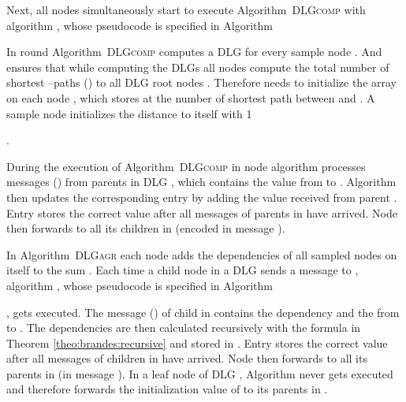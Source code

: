 \documentclass[11pt]{article}
\newcommand{\todoI}[1]{}\newcommand{\blueI}[1]{}
\newif\iffull
\newif\ifshort
\begin{document}
Next, all nodes simultaneously start to execute Algorithm\iffull~\ref{alg:DLGcomp}\fi~\textsc{DLGcomp} with algorithm , whose pseudocode is specified in Algorithm
\ifshort
 \ref{FULL:alg:BC_f} in Appendix \ref{sec:algBC}.
\fi
\iffull
 \ref{alg:BC_f}.
\fi
In round  Algorithm\iffull~\ref{alg:DLGcomp}\fi~\textsc{DLGcomp} computes a DLG  for every sample node . And  ensures that while computing the DLGs all nodes  compute the total number of shortest --paths () to all DLG root nodes . Therefore  needs to initialize the array  on each node , which stores at  the number of shortest path between  and \iffull (Lines \ref{line:fbcinitstart} to \ref{line:fbcinitend})\fi. A sample node  initializes the distance to itself with 1 

.
\iffull
\begin{algorithm}[htb]
\begin{algorithmic}[1]
\STATE \COMMENT{INITIALIZATION} \label{line:fbcinitstart}
\STATE \textbf{global} ; \COMMENT{ := total shortest paths from  to }
\IF{}
        \STATE ;\label{line:fbcinitend}\newline
\ENDIF

\STATE \COMMENT{COMPUTATION, :  root node ID of the message,  message of a parent in }
\STATE ;
\STATE ; \COMMENT{output}
\end{algorithmic}
\caption{}
\label{alg:BC_f}
\vspace*{0.5cm}
\end{algorithm}
\fi 
During the execution of Algorithm\iffull~\ref{alg:DLGcomp}\fi~\textsc{DLGcomp} in node  algorithm  processes messages () from parents  in DLG , which contains the value  from   to .
Algorithm  then updates the corresponding entry  by adding the value  received from parent . Entry  stores the correct value after all messages of parents in  have arrived. Node  then forwards  \iffull during the execution of Algorithm~\ref{alg:DLGcomp}~\textsc{DLGcomp} in Line \ref{line:sendreceivedist}\fi to all its children in  (encoded in message ).

In Algorithm\iffull~\ref{alg:DLGagr}\fi~\textsc{DLGagr} each node  adds the dependencies  of all sampled nodes  on itself to the sum . Each time a child node  in a DLG  sends a message to , algorithm , whose pseudocode is specified in Algorithm
\ifshort
 \ref{FULL:alg:BC_g} in Appendix \ref{FULL:sec:algBC}
\fi
\iffull
 \ref{alg:BC_g}
\fi
, gets executed. The message () of child  in  contains the dependency  and the  from  to . The dependencies \todoI{these are approx, should they be called ?} are then calculated recursively with the formula in Theorem \ref{theo:brandes:recursive} and stored in .
Entry  stores the correct value after all messages of children in  have arrived. Node  then forwards  \iffull during the execution of Algorithm~\ref{alg:DLGagr}~\textsc{DLGagr} in Line \ref{line:sendreceiveagg}\fi to all its parents in  (in message ). In a leaf node  of DLG , Algorithm  never gets executed and therefore forwards the initialization value of  to its parents in .
\end{document}
